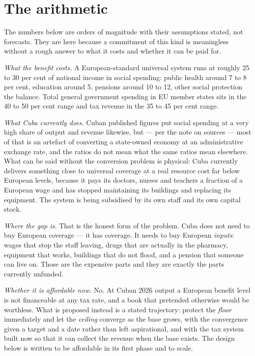 \section{The arithmetic}

The numbers below are orders of magnitude with their assumptions stated, not
forecasts. They are here because a commitment of this kind is meaningless
without a rough answer to what it costs and whether it can be paid for.

\emph{What the benefit costs.} A European-standard universal system runs at
roughly 25 to 30 per cent of national income in social spending: public health
around 7 to 8 per cent, education around 5, pensions around 10 to 12, other
social protection the balance. Total general government spending in EU member
states sits in the 40 to 50 per cent range and tax revenue in the 35 to 45 per
cent range.\unv{}

\emph{What Cuba currently does.} Cuban published figures put social spending at
a very high share of output and revenue likewise, but --- per the note on
sources --- most of that is an artefact of converting a state-owned economy at
an administrative exchange rate, and the ratios do not mean what the same ratios
mean elsewhere. What can be said without the conversion problem is physical:
Cuba currently delivers something close to universal coverage at a real resource
cost far below European levels, because it pays its doctors, nurses and teachers
a fraction of a European wage and has stopped maintaining its buildings and
replacing its equipment. The system is being subsidised by its own staff and its
own capital stock.

\emph{Where the gap is.} That is the honest form of the problem. Cuba does not
need to buy European coverage --- it has coverage. It needs to buy European
\emph{inputs}: wages that stop the staff leaving, drugs that are actually in the
pharmacy, equipment that works, buildings that do not flood, and a pension that
someone can live on. Those are the expensive parts and they are exactly the
parts currently unfunded.

\emph{Whether it is affordable now.} No. At Cuban 2026 output a European benefit
level is not financeable at any tax rate, and a book that pretended otherwise
would be worthless. What is proposed instead is a stated trajectory: protect the
\emph{floor} immediately and let the \emph{ceiling} converge as the base grows,
with the convergence given a target and a date rather than left aspirational,
and with the tax system built now so that it can collect the revenue when the
base exists. The design below is written to be affordable in its first phase and
to scale.

